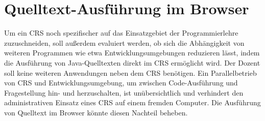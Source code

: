 \section{Quelltext-Ausführung im Browser}
\label{chap:codeausfuehrung}
Um ein CRS noch spezifischer auf das Einsatzgebiet der Programmierlehre zuzuschneiden, soll außerdem evaluiert werden, ob sich die Abhängigkeit von weiteren Programmen wie etwa Entwicklungsumgebungen reduzieren lässt, indem die Ausführung von Java-Quelltexten direkt im CRS ermöglicht wird. Der Dozent soll keine weiteren Anwendungen neben dem CRS benötigen. Ein Parallelbetrieb von CRS und Entwicklungsumgebung, um zwischen Code-Ausführung und Fragestellung hin- und herzuschalten, ist unübersichtlich und verhindert den administrativen Einsatz eines CRS auf einem fremden Computer. Die Ausführung von Quelltext im Browser könnte diesen Nachteil beheben.
